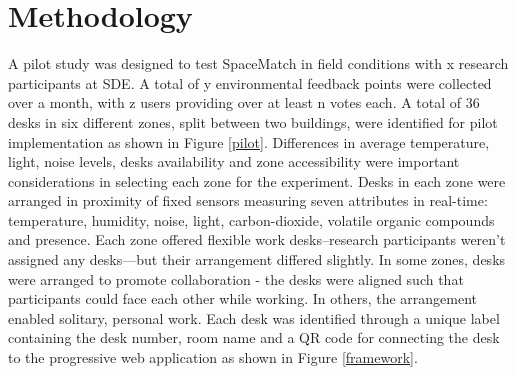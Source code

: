 \documentclass[]{interact}
\theoremstyle{plain}%
\theoremstyle{definition}
\theoremstyle{remark}
\begin{document}
\section{Methodology}

A pilot study was designed to test SpaceMatch in field conditions with x research participants at SDE. A total of y environmental feedback points were collected over a month, with z users providing over at least n votes each. A total of 36 desks in six different zones, split between two buildings, were identified for pilot implementation as shown in Figure \ref{pilot}. Differences in average temperature, light, noise levels, desks availability and zone accessibility were important considerations in selecting each zone for the experiment. Desks in each zone were arranged in proximity of fixed sensors measuring seven attributes in real-time: temperature, humidity, noise, light, carbon-dioxide, volatile organic compounds and presence. Each zone offered flexible work desks--research participants weren't assigned any desks---but their arrangement differed slightly. In some zones, desks were arranged to promote collaboration - the desks were aligned such that participants could face each other while working. In others, the arrangement enabled solitary, personal work. Each desk was identified through a unique label containing the desk number, room name and a QR code for connecting the desk to the progressive web application as shown in Figure \ref{framework}.
\end{document}
